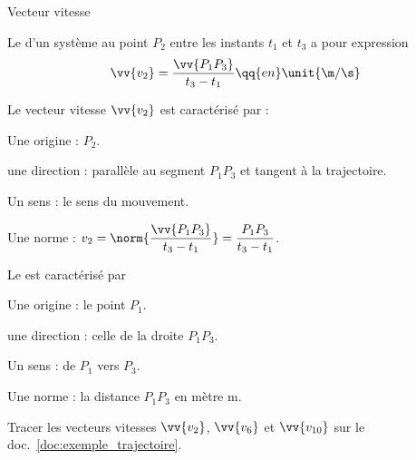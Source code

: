 \begin{doc}{Vecteur vitesse}
  \begin{importants}
    Le  d'un système au point $P_2$ entre les instants $t_1$ et $t_3$ a pour expression
    \begin{equation*}
      \vv{v_2} = \frac{\vv{P_1 P_3}}{t_3 - t_1} \qq{en} \unit{\m / \s}
    \end{equation*}
  \end{importants}
  
  Le vecteur vitesse $\vv{v_2}$ est caractérisé par :
  \begin{listePoints}[2]
    \item Une origine : $P_2$.
    \item une direction : parallèle au segment $P_1 P_3$ et tangent à la trajectoire.
    \item Un sens : le sens du mouvement.
    \item Une norme : $v_2 
    = \displaystyle \norm{\frac{\vv{P_1 P_3}}{t_3 - t_1}}
    = \displaystyle \frac{P_1 P_3}{t_3 - t_1}$.
  \end{listePoints}
  
  Le  est caractérisé par
  \begin{listePoints}[2]
    \item Une origine : le point $P_1$.
    \item une direction : celle de la droite $P_1 P_3$.
    \item Un sens : de $P_1$ vers $P_3$.
    \item Une norme : la distance $P_1 P_3$ en mètre \unit{m}.
  \end{listePoints}
\end{doc}

\schematisation Tracer les vecteurs vitesses $\vv{v_2}$, $\vv{v_6}$ et $\vv{v_{10}}$ sur le doc.~\ref{doc:exemple_trajectoire}.
